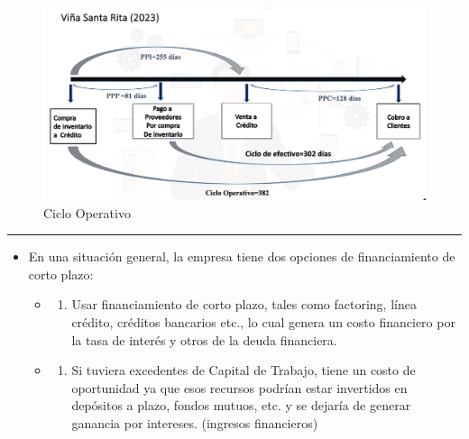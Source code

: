 \documentclass[
  letterpaper,
  DIV=11,
  numbers=noendperiod]{scrartcl}
\providecommand{\tightlist}{%
  \setlength{\itemsep}{0pt}\setlength{\parskip}{0pt}}\usepackage{longtable,booktabs,array}
\begin{document}
\begin{figure}[H]

{\centering \includegraphics{Ejemplo_Sta_Rita.png}

}

\caption{Ciclo Operativo}

\end{figure}%

\begin{center}\rule{0.5\linewidth}{0.5pt}\end{center}

\begin{itemize}
\tightlist
\item
  En una situación general, la empresa tiene dos opciones de
  financiamiento de corto plazo:

  \begin{itemize}
  \tightlist
  \item
    \begin{enumerate}
    \def\labelenumi{\arabic{enumi}.}
    \tightlist
    \item
      Usar financiamiento de corto plazo, tales como factoring, línea
      crédito, créditos bancarios etc., lo cual genera un costo
      financiero por la tasa de interés y otros de la deuda financiera.
    \end{enumerate}
  \item
    \begin{enumerate}
    \def\labelenumi{\arabic{enumi}.}
    \setcounter{enumi}{1}
    \tightlist
    \item
      Si tuviera excedentes de Capital de Trabajo, tiene un costo de
      oportunidad ya que esos recursos podrían estar invertidos en
      depósitos a plazo, fondos mutuos, etc. y se dejaría de generar
      ganancia por intereses. (ingresos financieros)
    \end{enumerate}
  \end{itemize}
\end{itemize}
\end{document}
